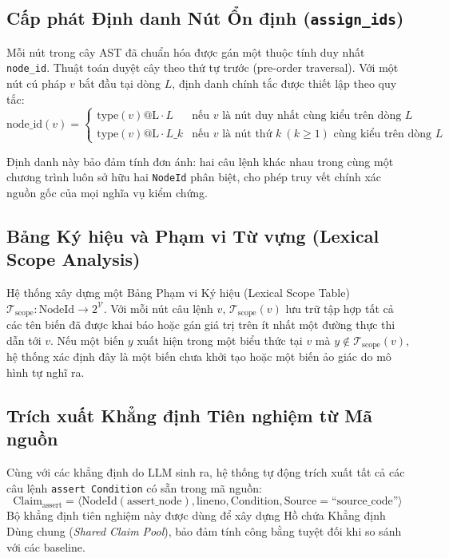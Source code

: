 \subsection{Cấp phát Định danh Nút Ổn định (\texttt{assign\_ids})}
Mỗi nút trong cây AST đã chuẩn hóa được gán một thuộc tính duy nhất \texttt{node\_id}. Thuật toán duyệt cây theo thứ tự trước (pre-order traversal). Với một nút cú pháp $v$ bắt đầu tại dòng $L$, định danh chính tắc được thiết lập theo quy tắc:
\begin{equation}
\text{node\_id}(v) = \begin{cases}
\text{type}(v) \text{@L} \cdot L & \text{nếu } v \text{ là nút duy nhất cùng kiểu trên dòng } L \\
\text{type}(v) \text{@L} \cdot L \text{\_} k & \text{nếu } v \text{ là nút thứ } k \ (k \ge 1) \text{ cùng kiểu trên dòng } L
\end{cases}
\end{equation}

Định danh này bảo đảm tính đơn ánh: hai câu lệnh khác nhau trong cùng một chương trình luôn sở hữu hai \texttt{NodeId} phân biệt, cho phép truy vết chính xác nguồn gốc của mọi nghĩa vụ kiểm chứng.

\subsection{Bảng Ký hiệu và Phạm vi Từ vựng (Lexical Scope Analysis)}
Hệ thống xây dựng một Bảng Phạm vi Ký hiệu (Lexical Scope Table) $\mathcal{T}_{\text{scope}}: \text{NodeId} \rightarrow 2^{\mathcal{V}}$. Với mỗi nút câu lệnh $v$, $\mathcal{T}_{\text{scope}}(v)$ lưu trữ tập hợp tất cả các tên biến đã được khai báo hoặc gán giá trị trên ít nhất một đường thực thi dẫn tới $v$. Nếu một biến $y$ xuất hiện trong một biểu thức tại $v$ mà $y \notin \mathcal{T}_{\text{scope}}(v)$, hệ thống xác định đây là một biến chưa khởi tạo hoặc một biến ảo giác do mô hình tự nghĩ ra.

\subsection{Trích xuất Khẳng định Tiên nghiệm từ Mã nguồn}
Cùng với các khẳng định do LLM sinh ra, hệ thống tự động trích xuất tất cả các câu lệnh \texttt{assert Condition} có sẵn trong mã nguồn:
\begin{equation}
\text{Claim}_{\text{assert}} = \langle \text{NodeId}(\text{assert\_node}), \text{lineno}, \text{Condition}, \text{Source} = \text{``source\_code''} \rangle
\end{equation}
Bộ khẳng định tiên nghiệm này được dùng để xây dựng Hồ chứa Khẳng định Dùng chung (\textit{Shared Claim Pool}), bảo đảm tính công bằng tuyệt đối khi so sánh với các baseline.

